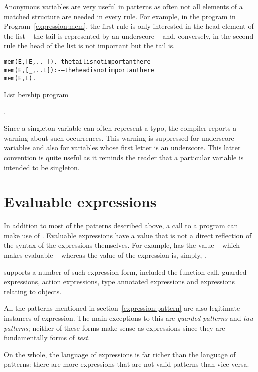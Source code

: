 Anonymous variables are very useful in patterns as often not all elements of a matched structure are needed in every rule. For example, in the  program in Program~\vref{expression:mem}, the first rule is only interested in the head element of the list -- the tail is represented by an underscore -- and, conversely, in the second rule the head of the list is not important but the tail is.
\begin{program}
\vspace{0.5ex}
\begin{alltt}
mem(E,[E,.._]).       -- the tail is not important here
mem(E,[_,..L]) :-     -- the head is not important here
  mem(E,L).
\end{alltt}
\vspace{-2ex}
\caption{List bership program}
\label{expression:mem}
\end{program}.

Since a singleton variable can often represent a typo, the \go compiler reports a warning about such occurrences. This warning is suppressed for underscore variables and also for variables whose first letter is an underscore. This latter convention is quite useful as it reminds the reader that a particular variable is intended to be singleton.

\section{Evaluable expressions}
\label{expression:evaluable}

In addition to most of the patterns described above, a call to a program can make use of . Evaluable expressions have a value that is not a direct reflection of the syntax of the expressions themselves. For example,  has the value  -- which makes \q{+} evaluable -- whereas the value of the expression \q{[1,2]} is, simply, \q{[1,2]}.

\go supports a number of such expression form, included the function call, guarded expressions, action expressions, type annotated expressions and expressions relating to objects.

\begin{aside}
All the patterns mentioned in section~\vref{expression:pattern} are also legitimate instances of expression. The main exceptions to this are \emph{guarded patterns} and \emph{tau patterns}; neither of these forms make sense as expressions since they are fundamentally forms of \emph{test}.

On the whole, the language of expressions is far richer than the language of patterns: there are more expressions that are not valid patterns than vice-versa.
\end{aside}

